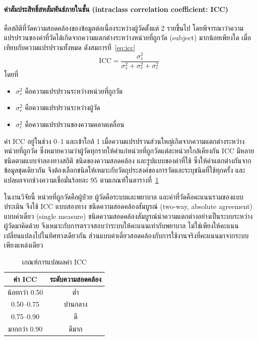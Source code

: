 \paragraph{ค่าสัมประสิทธิ์สหสัมพันธ์ภายในชั้น (intraclass correlation coefficient: ICC)}
คือสถิติที่วัดความสอดคล้องของข้อมูลต่อเนื่องระหว่างผู้วัดตั้งแต่ 2 รายขึ้นไป
โดยพิจารณาว่าความแปรปรวนของค่าที่วัดได้เกิดจากความแตกต่างระหว่างหน่วยที่ถูกวัด (subject) มากน้อยเพียงใด
เมื่อเทียบกับความแปรปรวนทั้งหมด ดังสมการที่~\eqref{eq:icc}
\begin{equation}
\mathrm{ICC} = \frac{\sigma^2_{s}}{\sigma^2_{s} + \sigma^2_{r} + \sigma^2_{e}}
\label{eq:icc}
\end{equation}
โดยที่
\begin{itemize}[nosep, before=\vspace{-0.5\parskip}]
    \item $\sigma^2_{s}$ คือความแปรปรวนระหว่างหน่วยที่ถูกวัด
    \item $\sigma^2_{r}$ คือความแปรปรวนระหว่างผู้วัด
    \item $\sigma^2_{e}$ คือความแปรปรวนของความคลาดเคลื่อน
\end{itemize}
\vspace{-\parskip}
ค่า ICC อยู่ในช่วง 0--1 และเข้าใกล้ 1 เมื่อความแปรปรวนส่วนใหญ่เกิดจากความแตกต่างระหว่างหน่วยที่ถูกวัด
ซึ่งหมายความว่าผู้วัดทุกรายให้ค่าแก่หน่วยที่ถูกวัดแต่ละหน่วยใกล้เคียงกัน
ICC มีหลายชนิดตามแบบจำลองทางสถิติ ชนิดของความสอดคล้อง และรูปแบบของค่าที่ใช้ ซึ่งให้ค่าแตกต่างกันจากข้อมูลชุดเดียวกัน
จึงต้องเลือกชนิดให้เหมาะกับวัตถุประสงค์ของการวัดและระบุชนิดที่ใช้ทุกครั้ง \citep{Koo2016}
และแปลผลจากช่วงความเชื่อมั่นร้อยละ 95 ตามเกณฑ์ในตารางที่~\ref{tab:icc-interp}

ในงานวิจัยนี้ หน่วยที่ถูกวัดคือผู้ป่วย ผู้วัดคือระบบและพยาบาล และค่าที่วัดคือคะแนนรวมของแบบประเมิน
จึงใช้ ICC แบบสองทาง ชนิดความสอดคล้องสัมบูรณ์ (two-way, absolute agreement) แบบค่าเดี่ยว (single measure)
ชนิดความสอดคล้องสัมบูรณ์นำความแตกต่างอย่างเป็นระบบระหว่างผู้วัดมาคิดด้วย จึงเหมาะกับการตรวจสอบว่าระบบให้คะแนนเท่ากับพยาบาล
ไม่ใช่เพียงให้คะแนนเปลี่ยนแปลงไปในทิศทางเดียวกัน ส่วนแบบค่าเดี่ยวสอดคล้องกับการใช้งานจริงที่คะแนนมาจากระบบเพียงแหล่งเดียว

\begin{table}[htbp]
\centering
\begin{tabular}{cc}
\hline
\textbf{ค่า ICC} & \textbf{ระดับความสอดคล้อง} \\
\hline
น้อยกว่า 0.50 & ต่ำ \\
0.50--0.75 & ปานกลาง \\
0.75--0.90 & ดี \\
มากกว่า 0.90 & ดีมาก \\
\hline
\end{tabular}
\caption{เกณฑ์การแปลผลค่า ICC \citep{Koo2016}}
\label{tab:icc-interp}
\end{table}

